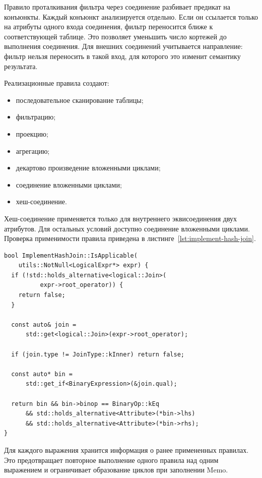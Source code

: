 \documentclass[fontsize=14pt, russian]{scrartcl}
\begin{document}
Правило проталкивания фильтра через соединение разбивает предикат на конъюнкты.
Каждый конъюнкт анализируется отдельно. Если он ссылается только на атрибуты
одного входа соединения, фильтр переносится ближе к соответствующей таблице. Это
позволяет уменьшить число кортежей до выполнения соединения. Для внешних
соединений учитывается направление: фильтр нельзя переносить в такой вход, для
которого это изменит семантику результата.

Реализационные правила создают:
\begin{itemize}
  \item последовательное сканирование таблицы;
  \item фильтрацию;
  \item проекцию;
  \item агрегацию;
  \item декартово произведение вложенными циклами;
  \item соединение вложенными циклами;
  \item хеш-соединение.
\end{itemize}

Хеш-соединение применяется только для внутреннего эквисоединения двух атрибутов.
Для остальных условий доступно соединение вложенными циклами. Проверка
применимости правила приведена в листинге~\ref{lst:implement-hash-join}.

\begin{listing}[H]
  \caption{Проверка применимости хеш-соединения.}
  \label{lst:implement-hash-join}
  \begin{verbatim}
bool ImplementHashJoin::IsApplicable(
    utils::NotNull<LogicalExpr*> expr) {
  if (!std::holds_alternative<logical::Join>(
          expr->root_operator)) {
    return false;
  }

  const auto& join =
      std::get<logical::Join>(expr->root_operator);

  if (join.type != JoinType::kInner) return false;

  const auto* bin =
      std::get_if<BinaryExpression>(&join.qual);

  return bin && bin->binop == BinaryOp::kEq
      && std::holds_alternative<Attribute>(*bin->lhs)
      && std::holds_alternative<Attribute>(*bin->rhs);
}
  \end{verbatim}
\end{listing}

Для каждого выражения хранится информация о ранее примененных правилах. Это
предотвращает повторное выполнение одного правила над одним выражением и
ограничивает образование циклов при заполнении Memo.
\end{document}
